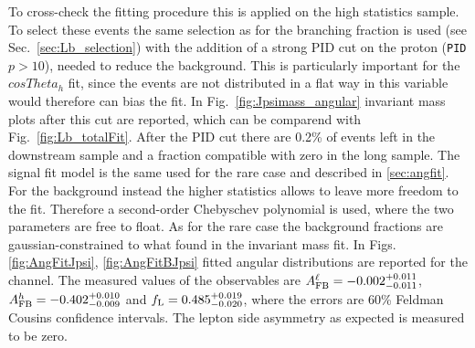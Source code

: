To cross-check the fitting procedure this is applied on the high statistics \Lb\to\jpsi\Lz sample.
To select these events the same selection as for the branching fraction is used (see Sec.~\ref{sec:Lb_selection})
with the addition of a strong PID cut on the proton (\verb!PID!$p > 10$), needed to reduce the
\KS\jpsi background. This is particularly important for the $cosTheta_h$ fit, since 
the \KS events are not distributed in a flat way in this variable would therefore can bias the fit.
In Fig.~\ref{fig:Jpsimass_angular} invariant mass plots after this cut are reported, which can be comparend with
Fig.~\ref{fig:Lb_totalFit}. %
After the PID cut there are 0.2\% of \KS events left in the downstream sample and a fraction
compatible with zero in the long sample.
The signal fit model is the same used for the rare case and described in \ref{sec:angfit}.
For the background instead the higher statistics allows to leave more freedom to the fit.
Therefore a second-order Chebyschev polynomial is used, where the two parameters are
free to float. As for the rare case the background fractions are gaussian-constrained
to what found in the invariant mass fit. In Figs. \ref{fig:AngFitJpsi}, \ref{fig:AngFitBJpsi} 
fitted angular distributions are reported for the \jpsi channel. The measured values of the observables
are $A_{\rm FB}^\ell = -0.002^{+0.011}_{-0.011}$, $A_{\rm FB}^h = -0.402^{+0.010}_{-0.009}$
and $f_{\rm L} = 0.485^{+0.019}_{-0.020}$, where the errors are 60\% Feldman Cousins confidence intervals.
The lepton side asymmetry as expected is measured to be zero.

